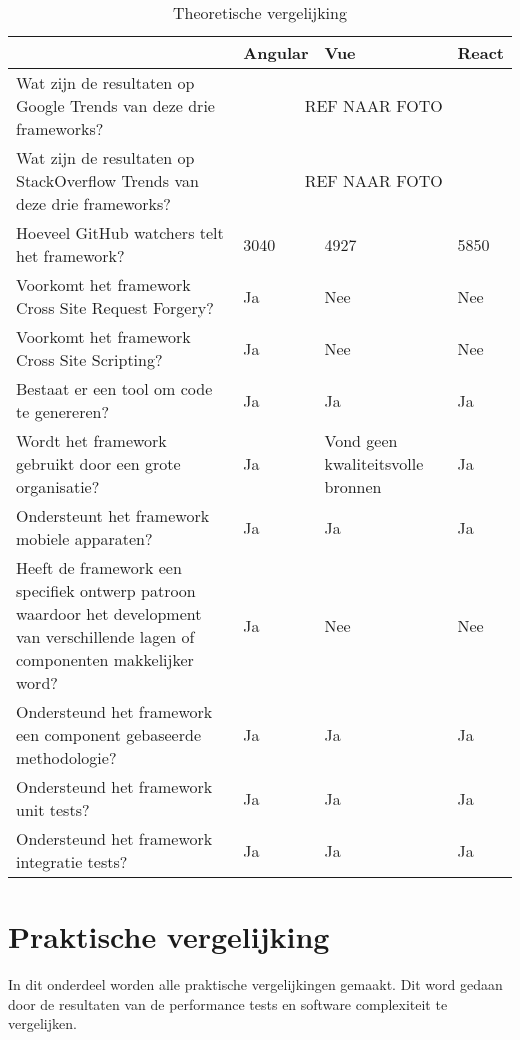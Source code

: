 \begin{table}[]
	\centering
	\caption{Theoretische vergelijking}
	\label{table:theoretische_vergelijking}
	\begin{tabular}{|p{7cm}||p{3cm}|p{3cm}|p{3cm}|}
		\hline
		&Angular &Vue   &React \\ \hline \hline
		Wat zijn de resultaten op Google Trends van deze drie frameworks?
		&\multicolumn{3}{c|}{REF NAAR FOTO}\\ \hline
		Wat zijn de resultaten op StackOverflow Trends van deze drie frameworks?
		&\multicolumn{3}{c|}{REF NAAR FOTO}\\ \hline
		Hoeveel GitHub watchers telt het framework? \autocite{github_front-end_????} 
		&3040     &4927  &5850 \\ \hline
		Voorkomt het framework Cross Site Request Forgery? \autocite{_angular_2018-1}
		&Ja         &Nee    &Nee \\ \hline
		Voorkomt het framework Cross Site Scripting? \autocite{_angular_2018-1}
		&Ja         &Nee    &Nee \\ \hline
		Bestaat er een tool om code te genereren?
		&Ja         &Ja     &Ja       \\ \hline
		Wordt het framework gebruikt door een grote organisatie? \autocite{_made_????} \autocite{_made_????-1}
		&Ja         &Vond geen kwaliteitsvolle bronnen &Ja \\ \hline
		Ondersteunt het framework mobiele apparaten?
		&Ja         &Ja     &Ja       \\ \hline
		Heeft de framework een specifiek ontwerp patroon waardoor het development van verschillende lagen of componenten makkelijker word?
		&Ja         &Nee   &Nee       \\ \hline
		Ondersteund het framework een component gebaseerde methodologie?
		&Ja         &Ja     &Ja       \\ \hline
		Ondersteund het framework unit tests? \autocite{_testing_2018} \autocite{_testing_2018-2} \autocite{_testing_2018-1}
		&Ja         &Ja     &Ja       \\ \hline
		Ondersteund het framework integratie tests?
		&Ja         &Ja     &Ja      \\  \hline
	\end{tabular}
\end{table}


\section{Praktische vergelijking}
\label{sec:praktische_vergelijking}
In dit onderdeel worden alle praktische vergelijkingen gemaakt. Dit word gedaan door de resultaten van de performance tests en software complexiteit te vergelijken.

